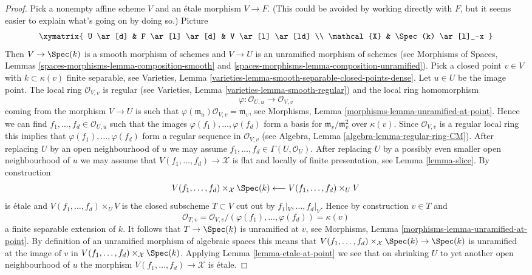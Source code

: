 \begin{proof}
\medskip\noindent
Pick a nonempty affine scheme $V$ and an \'etale morphism $V \to F$.
(This could be avoided by working directly with $F$, but it seems easier
to explain what's going on by doing so.) Picture
$$
\xymatrix{
U \ar[d] & F  \ar[l] \ar[d] & V \ar[l] \ar[ld] \\
\mathcal{X} & \Spec(k) \ar[l]_-x
}
$$
Then $V \to \Spec(k)$ is a smooth morphism of schemes and $V \to U$ is an
unramified morphism of schemes (see
Morphisms of Spaces, Lemmas
\ref{spaces-morphisms-lemma-composition-smooth} and
\ref{spaces-morphisms-lemma-composition-unramified}).
Pick a closed point $v \in V$ with $k \subset \kappa(v)$ finite separable, see
Varieties, Lemma \ref{varieties-lemma-smooth-separable-closed-points-dense}.
Let $u \in U$ be the image point. The local ring
$\mathcal{O}_{V, v}$ is regular (see
Varieties, Lemma \ref{varieties-lemma-smooth-regular})
and the local ring homomorphism
$$
\varphi : \mathcal{O}_{U, u} \longrightarrow \mathcal{O}_{V, v}
$$
coming from the morphism $V \to U$ is such that
$\varphi(\mathfrak m_u)\mathcal{O}_{V, v} = \mathfrak m_v$, see
Morphisms, Lemma \ref{morphisms-lemma-unramified-at-point}.
Hence we can find $f_1, \ldots, f_d \in \mathcal{O}_{U, u}$
such that the images $\varphi(f_1), \ldots, \varphi(f_d)$
form a basis for $\mathfrak m_v/\mathfrak m_v^2$ over $\kappa(v)$.
Since $\mathcal{O}_{V, v}$ is a regular local ring this implies
that $\varphi(f_1), \ldots, \varphi(f_d)$ form a regular sequence
in $\mathcal{O}_{V, v}$ (see
Algebra, Lemma \ref{algebra-lemma-regular-ring-CM}).
After replacing $U$ by an open neighbourhood of $u$ we may assume
$f_1, \ldots, f_d \in \Gamma(U, \mathcal{O}_U)$. After replacing
$U$ by a possibly even smaller open neighbourhood of $u$ we may
assume that $V(f_1, \ldots, f_d) \to \mathcal{X}$ is flat and
locally of finite presentation, see
Lemma \ref{lemma-slice}.
By construction
$$
V(f_1, \ldots, f_d) \times_\mathcal{X} \Spec(k)
\longleftarrow
V(f_1, \ldots, f_d) \times_U V
$$
is \'etale and $V(f_1, \ldots, f_d) \times_U V$
is the closed subscheme $T \subset V$ cut out by $f_1|_V, \ldots, f_d|_V$.
Hence by construction $v \in T$ and
$$
\mathcal{O}_{T, v} =
\mathcal{O}_{V, v}/(\varphi(f_1), \ldots, \varphi(f_d)) = \kappa(v)
$$
a finite separable extension of $k$. It follows that $T \to \Spec(k)$
is unramified at $v$, see
Morphisms, Lemma \ref{morphisms-lemma-unramified-at-point}.
By definition of an unramified morphism of algebraic spaces this means that
$V(f_1, \ldots, f_d) \times_\mathcal{X} \Spec(k) \to \Spec(k)$
is unramified at the image of $v$ in
$V(f_1, \ldots, f_d) \times_\mathcal{X} \Spec(k)$.
Applying
Lemma \ref{lemma-etale-at-point}
we see that on shrinking $U$ to yet another open neighbourhood of $u$
the morphism $V(f_1, \ldots, f_d) \to \mathcal{X}$ is \'etale.


\end{proof}
